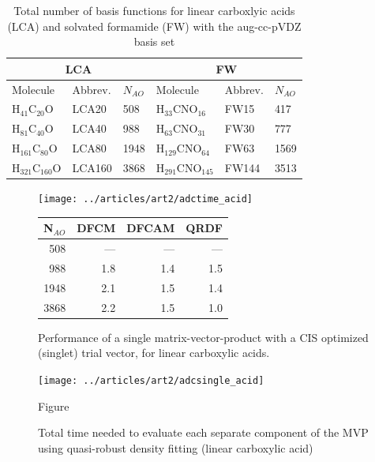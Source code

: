 \begin{table}
\centering
\begin{tabular}{llllll}
\hline
\multicolumn{3}{c}{LCA} & \multicolumn{3}{c}{FW} \\ \hline
Molecule & Abbrev. & $N_{AO}$ & Molecule & Abbrev. & $N_{AO}$ \\ \hline
H$_{41}$C$_{20}$O & LCA20 & 508 & H$_{33}$CNO$_{16}$ & FW15 & 417 \\
H$_{81}$C$_{40}$O & LCA40 & 988 & H$_{63}$CNO$_{31}$ & FW30 & 777 \\
H$_{161}$C$_{80}$O & LCA80 & 1948 & H$_{129}$CNO$_{64}$ & FW63 & 1569 \\
H$_{321}$C$_{160}$O & LCA160 & 3868 & H$_{291}$CNO$_{145}$ & FW144 & 3513 \\
\hline
\end{tabular}
\label{tab:ES_NUMBAS}
\caption{Total number of basis functions for linear carboxlyic acids (LCA) and solvated formamide (FW) with the aug-cc-pVDZ basis set}
\end{table}

\begin{figure}
\begin{minipage}{0.5\textwidth}
\centering
\texttt{[image: ../articles/art2/adctime\_acid]}
\end{minipage}
\begin{minipage}{0.4\textwidth}
\centering
\begin{tabular}{rrrr}
\hline
N$_{AO}$ & DFCM & DFCAM & QRDF \\ \hline
508 & --- & --- & --- \\ 
988 & 1.8 & 1.4 & 1.5 \\ 
1948 & 2.1 & 1.5 & 1.4 \\ 
3868 & 2.2 & 1.5 & 1.0 \\
 \hline
\end{tabular}
\end{minipage}
\caption{Performance of a single matrix-vector-product with a CIS optimized (singlet) trial vector, for linear carboxylic acids.}
\label{fig:ES_TIME_LCA}
\end{figure}

\begin{figure}
\centering
\texttt{[image: ../articles/art2/adcsingle\_acid]}
\caption{Figure}
\caption{Total time needed to evaluate each separate component of the MVP using quasi-robust density fitting (linear carboxylic acid)}
\label{fig:ES_TIMESINGLE_LCA}
\end{figure}

